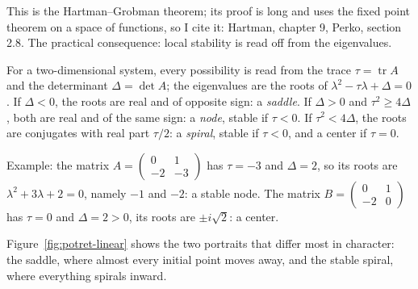 This is the Hartman--Grobman theorem; its proof is long and uses the fixed point theorem on a
space of functions, so I cite it: Hartman, chapter 9, Perko, section 2.8. The practical
consequence: local stability is read off from the eigenvalues.

For a two-dimensional system, every possibility is read from the trace
$\tau=\operatorname{tr}A$ and the determinant $\Delta=\det A$; the eigenvalues are the roots
of $\lambda^{2}-\tau\lambda+\Delta=0$. If $\Delta<0$, the roots are real and of
opposite sign: a \emph{saddle}. If $\Delta>0$ and $\tau^{2}\ge4\Delta$,
both are real and of the same sign: a \emph{node}, stable if $\tau<0$. If
$\tau^{2}<4\Delta$, the roots are conjugates with real part $\tau/2$:
a \emph{spiral}, stable if $\tau<0$, and a center if $\tau=0$.

Example: the matrix $A=\begin{pmatrix}0&1\\-2&-3\end{pmatrix}$ has $\tau=-3$
and $\Delta=2$, so its roots are $\lambda^{2}+3\lambda+2=0$, namely $-1$ and
$-2$: a stable node. The matrix $B=\begin{pmatrix}0&1\\-2&0\end{pmatrix}$ has
$\tau=0$ and $\Delta=2>0$, its roots are $\pm i\sqrt{2}$: a center.

Figure~\ref{fig:potret-linear} shows the two portraits that differ most in character: the
saddle, where almost every initial point moves away, and the stable spiral, where everything
spirals inward.

